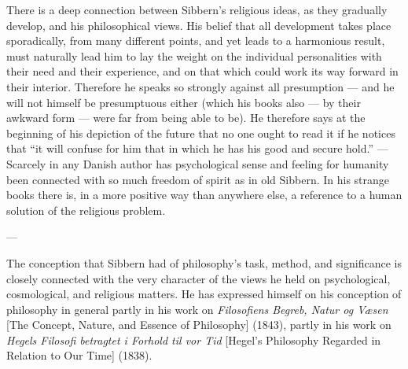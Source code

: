 \documentclass[12pt,a4paper]{book}
\begin{document}
There is a deep connection between Sibbern's religious ideas, as they gradually develop, and his
philosophical views. His belief that all development takes place sporadically, from many
different points, and yet leads to a harmonious result, must naturally lead him to lay the
weight on the individual personalities with their need and their experience, and on that which
could work its way forward in their interior. Therefore he speaks so strongly against all
presumption --- and he will not himself be presumptuous either (which his books also --- by
their awkward form --- were far from being able to be). He therefore says at the beginning of
his depiction of the future that no one ought to read it if he notices that ``it will confuse
for him that in which he has his good and secure hold.'' --- Scarcely in any Danish author has
psychological sense and feeling for humanity been connected with so much freedom of spirit as in
old Sibbern. In his strange books there is, in a more positive way than anywhere else, a
reference to a human solution of the religious problem.

\begin{center}---\end{center}

The conception that Sibbern had of philosophy's task, method, and significance is closely
connected with the very character of the views he held on psychological, cosmological, and
religious matters. He has expressed himself on his conception of philosophy in general partly in
his work on \emph{Filosofiens Begreb, Natur og Væsen} [The Concept, Nature, and Essence of
Philosophy] (1843), partly in his work on \emph{Hegels Filosofi betragtet i Forhold til vor Tid}
[Hegel's Philosophy Regarded in Relation to Our Time] (1838).
\end{document}
